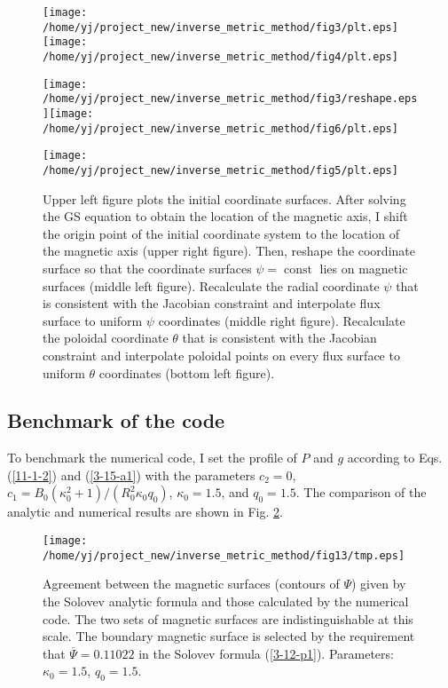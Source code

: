 \documentclass{article}
\newcommand{\tmop}[1]{\ensuremath{\operatorname{#1}}}
\begin{document}
\begin{figure}[h]
  \texttt{[image: /home/yj/project\_new/inverse\_metric\_method/fig3/plt.eps]}\texttt{[image: /home/yj/project\_new/inverse\_metric\_method/fig4/plt.eps]}
  
  \texttt{[image: /home/yj/project\_new/inverse\_metric\_method/fig3/reshape.eps]}\texttt{[image: /home/yj/project\_new/inverse\_metric\_method/fig6/plt.eps]}
  
  \texttt{[image: /home/yj/project\_new/inverse\_metric\_method/fig5/plt.eps]}
  \caption{\label{12-26-1}Upper left figure plots the initial coordinate
  surfaces. After solving the GS equation to obtain the location of the
  magnetic axis, I shift the origin point of the initial coordinate system to
  the location of the magnetic axis (upper right figure). Then, reshape the
  coordinate surface so that the coordinate surfaces $\psi = \tmop{const}$
  lies on magnetic surfaces (middle left figure). Recalculate the radial
  coordinate $\psi$ that is consistent with the Jacobian constraint and
  interpolate flux surface to uniform $\psi$ coordinates (middle right
  figure). Recalculate the poloidal coordinate $\theta$ that is consistent
  with the Jacobian constraint and interpolate poloidal points on every flux
  surface to uniform $\theta$ coordinates (bottom left figure).}
\end{figure}

\subsection{Benchmark of the code}

To benchmark the numerical code, I set the profile of $P$ and $g$ according to
Eqs. (\ref{11-1-2}) and (\ref{3-15-a1}) with the parameters $c_2 = 0$, $c_1 =
B_0 (\kappa_0^2 + 1) / (R_0^2 \kappa_0 q_0)$, $\kappa_0 = 1.5$, and $q_0 =
1.5$. The comparison of the analytic and numerical results are shown in Fig.
\ref{3-15-a2}.

\begin{figure}[h]
  \texttt{[image: /home/yj/project\_new/inverse\_metric\_method/fig13/tmp.eps]}
  \caption{\label{3-15-a2}Agreement between the magnetic surfaces (contours of
  $\Psi$) given by the Solovev analytic formula and those calculated by the
  numerical code. The two sets of magnetic surfaces are indistinguishable at
  this scale. The boundary magnetic surface is selected by the requirement
  that $\overline{\Psi} = 0.11022$ in the Solovev formula (\ref{3-12-p1}).
  Parameters: $\kappa_0 = 1.5$, $q_0 = 1.5$.}
\end{figure}
\end{document}

